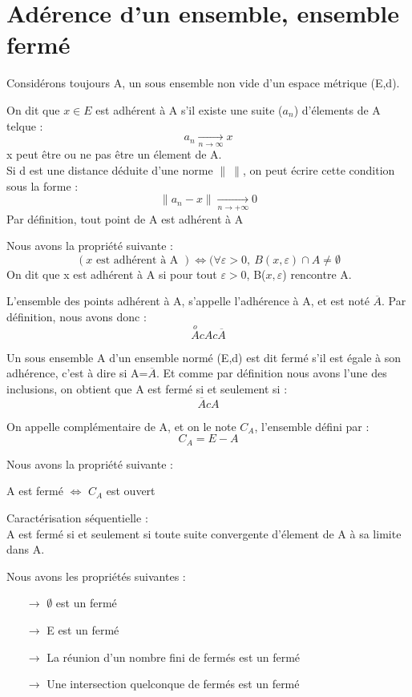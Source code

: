\section{Adérence d'un ensemble, ensemble fermé}
Considérons toujours A, un sous ensemble non vide d'un espace métrique (E,d).
\begin{de}
On dit que $x \in E$ est adhérent à A s'il existe une suite ($a_n$) d'élements de A telque : 
$$a_n \underset{n \rightarrow \infty}\rightarrow x$$
x peut être ou ne pas être un élement de A.\\
Si d est une distance déduite d'une norme $\parallel~\parallel$, on peut écrire cette condition sous la forme : 
$$\parallel a_n - x \parallel \underset{n\rightarrow +\infty}\rightarrow 0$$
Par définition, tout point de A est adhérent à A
\end{de}
\begin{prop}
Nous avons la propriété suivante : 
$$( x \mbox{ est adhérent à A }) \Leftrightarrow (\forall \varepsilon > 0,~ B(x,\varepsilon) \cap A \neq \emptyset$$
On dit que x est adhérent à A si pour tout $\varepsilon >0$, B($x,\varepsilon$) rencontre A.
\end{prop}
\begin{de}
L'ensemble des points adhérent à A, s'appelle l'adhérence à A, et est noté $\overline{A}$. Par définition, nous avons donc : 
$$\overset{o}A c A c \overline{A}$$
\end{de}
\begin{de}
Un sous ensemble A d'un ensemble normé (E,d) est dit fermé s'il est égale à son adhérence, c'est à dire si A=$\overline{A}$. Et comme par définition nous avons l'une des inclusions, on obtient que A est fermé si et seulement si : 
$$\overline{A} c A$$
\end{de}
\begin{de}
On appelle complémentaire de A, et on le note $C_A$, l'ensemble défini par : 
$$C_A = E - A$$
\end{de}
\begin{prop}
Nous avons la propriété suivante :
\begin{center}
 A est fermé $\Leftrightarrow$ $C_A$ est ouvert
\end{center}
\end{prop}
\begin{prop}
Caractérisation séquentielle : \\
A est fermé si et seulement si toute suite convergente d'élement de A à sa limite dans A.
\end{prop}
\begin{prop}
Nous avons les propriétés suivantes : 
\begin{itemize}
 \item[$\rightarrow$] $\emptyset$ est un fermé
 \item[$\rightarrow$] E est un fermé
 \item[$\rightarrow$] La réunion d'un nombre fini de fermés est un fermé
 \item[$\rightarrow$] Une intersection quelconque de fermés est un fermé
\end{itemize}
\end{prop}
